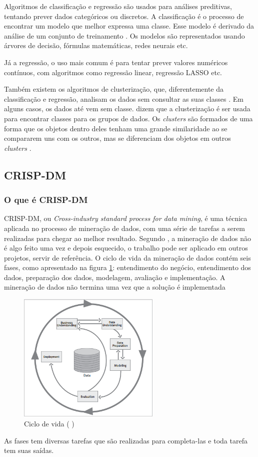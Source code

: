 Algoritmos de classificação e regressão são usados para análises preditivas, tentando prever dados categóricos ou discretos. A classificação é o processo de encontrar um modelo que melhor expressa uma classe. Esse modelo é derivado da análise de um conjunto de treinamento \citep{jmj}. Os modelos são representados usando árvores de decisão, fórmulas matemáticas, redes neurais etc.

Já a regressão, o uso mais comum é para tentar prever valores numéricos contínuos, com algoritmos como regressão linear, regressão LASSO etc.

Também existem os algoritmos de clusterização, que, diferentemente da classificação e regressão, analisam os dados sem consultar as suas classes \citep{jmj}. Em alguns casos, os dados até vem sem classe. \citeauthor{jmj} dizem que a clusterização é ser usada para encontrar classes para os grupos de dados. Os \textit{clusters} são formados de uma forma que os objetos dentro deles tenham uma grande similaridade ao se compararem uns com os outros, mas se diferenciam dos objetos em outros \textit{clusters} \citep{jmj}.

\subsection{CRISP-DM}
\subsubsection{O que é CRISP-DM}
CRISP-DM, ou\textit{ Cross-industry standard process for data mining}, é uma técnica aplicada no processo de mineração de dados, com uma série de tarefas a serem realizadas para chegar ao melhor resultado.
Segundo , a mineração de dados não é algo feito uma vez e depois esquecido, o trabalho pode ser aplicado em outros projetos, servir de referência.
O ciclo de vida da mineração de dados contém seis fases, como apresentado na figura \ref{crispcycle}: entendimento do negócio, entendimento dos dados, preparação dos dados, modelagem, avaliação e implementação. 
A mineração de dados não termina uma vez que a solução é implementada \citep{crispmanual}
\begin{figure}[H]
\centering
\includegraphics[height=6.2cm]{imagens/lifecycle.png}
\caption{Ciclo de vida (\citeauthor{crispmanual} \citeyear{crispmanual})}
\label{crispcycle}
\end{figure}
As fases tem diversas tarefas que são realizadas para completa-las e toda tarefa tem suas saídas.
